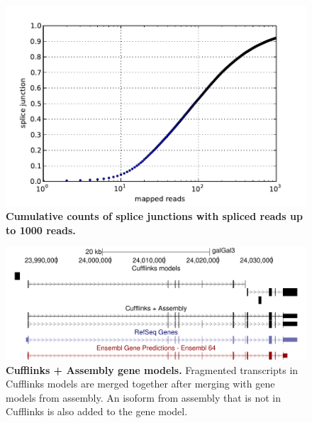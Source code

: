 \documentclass[10pt]{article}
\begin{document}
\begin{figure}[!ht]
\begin{center}
\includegraphics[width=5in]{cdf_single_splice.pdf}
\end{center}
\caption{
{\bf Cumulative counts of splice junctions with spliced reads up to 1000 reads.}
}
\label{cdf_single_splice}
\end{figure}

\begin{figure}[!ht]
\begin{center}
\includegraphics[width=5in]{asm-cufflinks.pdf}
\end{center}
\caption{
{\bf Cufflinks + Assembly gene models.}
Fragmented transcripts in Cufflinks models are merged together after merging with gene models from assembly.
An isoform from assembly that is not in Cufflinks is also added to the gene model.
}
\label{cufflinks_asm}
\end{figure}
\end{document}
